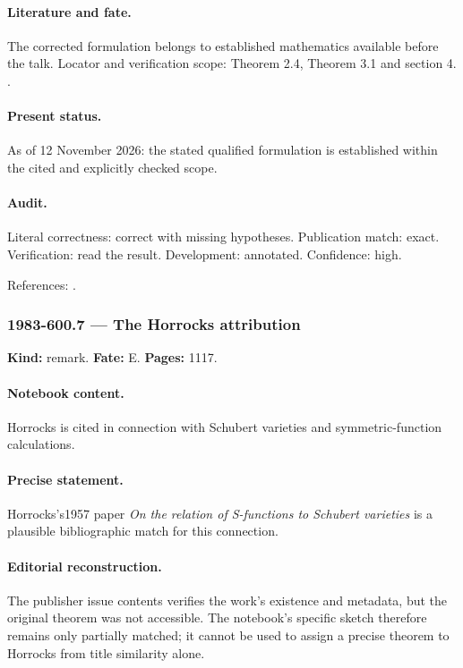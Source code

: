 \paragraph{Literature and fate.} The corrected formulation belongs to established mathematics available before the talk. Locator and verification scope: Theorem 2.4, Theorem 3.1 and section 4. \cite{stanley1980weyl}.

\paragraph{Present status.} As of 12 November 2026: the stated qualified formulation is established within the cited and explicitly checked scope.

\paragraph{Audit.} Literal correctness: correct with missing hypotheses. Publication match: exact. Verification: read the result. Development: annotated. Confidence: high.

\noindent References: \citep{stanley1980weyl}.\par

\subsubsection{1983-600.7 --- The Horrocks attribution}

\label{item:1983-600.7}

\noindent\textbf{Kind:} remark. \textbf{Fate:} E. \textbf{Pages:} 1117.\par

\paragraph{Notebook content.} Horrocks is cited in connection with Schubert varieties and symmetric-function calculations.

\paragraph{Precise statement.} Horrocks's1957 paper \emph{On the relation of S-functions to Schubert varieties} is a plausible bibliographic match for this connection.

\paragraph{Editorial reconstruction.} The publisher issue contents verifies the work's existence and metadata, but the original theorem was not accessible. The notebook's specific sketch therefore remains only partially matched; it cannot be used to assign a precise theorem to Horrocks from title similarity alone.

